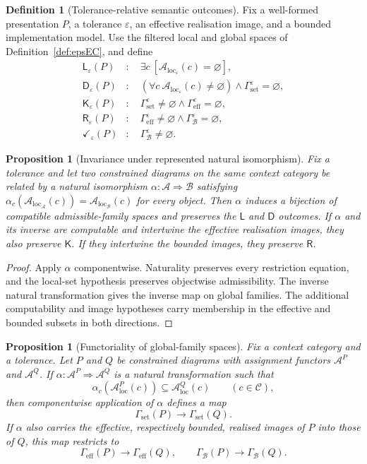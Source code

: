 \documentclass[11pt]{article}
\theoremstyle{plain}
\newtheorem{proposition}[theorem]{Proposition}
\theoremstyle{definition}
\newtheorem{definition}[theorem]{Definition}
\theoremstyle{remark}
\newcommand{\LocalAdm}{\mathcal{A}_{\mathrm{loc}}}
\newcommand{\eps}{\varepsilon}
\begin{document}
\begin{definition}[Tolerance-relative semantic outcomes]\label{def:first}
Fix a well-formed presentation $P$, a tolerance $\eps$, an effective
realisation image, and a bounded implementation model. Use the filtered local
and global spaces of Definition~\ref{def:epsEC}, and define
\begin{align*}
\mathsf L_\eps(P)&:\quad
 \exists c\ [\LocalAdm_\eps(c)=\varnothing],\\
\mathsf D_\eps(P)&:\quad
 (\forall c\ \LocalAdm_\eps(c)\ne\varnothing)
 \land\Gamma_{\mathrm{set}}^\eps=\varnothing,\\
\mathsf K_\eps(P)&:\quad
 \Gamma_{\mathrm{set}}^\eps\ne\varnothing
 \land\Gamma_{\mathrm{eff}}^\eps=\varnothing,\\
\mathsf R_\eps(P)&:\quad
 \Gamma_{\mathrm{eff}}^\eps\ne\varnothing
 \land\Gamma_{\mathcal B}^\eps=\varnothing,\\
\checkmark_\eps(P)&:\quad
 \Gamma_{\mathcal B}^\eps\ne\varnothing.
\end{align*}
\end{definition}

\begin{proposition}[Invariance under represented natural isomorphism]
\label{prop:presentation-invariance}
Fix a tolerance and let two constrained diagrams on the same context category
be related by a natural isomorphism $\alpha:\mathcal A\Rightarrow\mathcal B$ satisfying
$\alpha_c(\LocalAdm_{\mathcal A}(c))=
\LocalAdm_{\mathcal B}(c)$ for every object. Then $\alpha$ induces a bijection
of compatible admissible-family spaces and preserves the $\mathsf L$ and
$\mathsf D$ outcomes. If $\alpha$ and its inverse are computable and intertwine
the effective realisation images, they also preserve $\mathsf K$. If they
intertwine the bounded images, they preserve $\mathsf R$.
\end{proposition}

\begin{proof}
Apply $\alpha$ componentwise. Naturality preserves every restriction equation,
and the local-set hypothesis preserves objectwise admissibility. The inverse
natural transformation gives the inverse map on global families. The additional
computability and image hypotheses carry membership in the effective and bounded
subsets in both directions.
\end{proof}

\begin{proposition}[Functoriality of global-family spaces]
\label{prop:global-family-functoriality}
Fix a context category and a tolerance. Let $P$ and $Q$ be constrained diagrams
with assignment functors $\mathcal A^P$ and $\mathcal A^Q$. If
$\alpha:\mathcal A^P\Rightarrow\mathcal A^Q$ is a natural transformation such
that
\[
\alpha_c(\LocalAdm^P(c))\subseteq\LocalAdm^Q(c)
\qquad(c\in\mathcal C),
\]
then componentwise application of $\alpha$ defines a map
\[
\Gamma_{\mathrm{set}}(P)\longrightarrow\Gamma_{\mathrm{set}}(Q).
\]
If $\alpha$ also carries the effective, respectively bounded, realised images
of $P$ into those of $Q$, this map restricts to
\[
\Gamma_{\mathrm{eff}}(P)\to\Gamma_{\mathrm{eff}}(Q),
\qquad
\Gamma_{\mathcal B}(P)\to\Gamma_{\mathcal B}(Q).
\]
\end{proposition}
\end{document}
